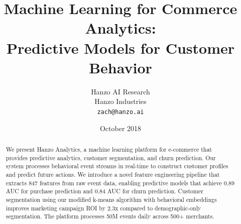 \documentclass[11pt,a4paper]{article}
\title{\textbf{Machine Learning for Commerce Analytics:\\Predictive Models for Customer Behavior}}
\author{
    Hanzo AI Research\\
    Hanzo Industries\\
    \texttt{zach@hanzo.ai}
}
\date{October 2018}
\begin{document}
\hanzocoverpage

\begin{abstract}
We present Hanzo Analytics, a machine learning platform for e-commerce that provides predictive analytics, customer segmentation, and churn prediction. Our system processes behavioral event streams in real-time to construct customer profiles and predict future actions. We introduce a novel feature engineering pipeline that extracts 847 features from raw event data, enabling predictive models that achieve 0.89 AUC for purchase prediction and 0.84 AUC for churn prediction. Customer segmentation using our modified k-means algorithm with behavioral embeddings improves marketing campaign ROI by 2.3x compared to demographic-only segmentation. The platform processes 50M events daily across 500+ merchants.
\end{abstract}












\end{document}
